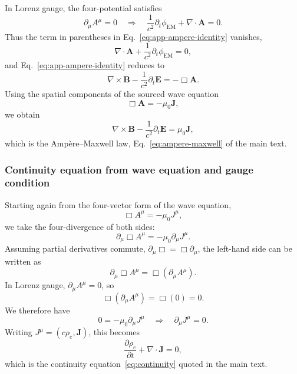 \documentclass[11pt]{article}
\begin{document}
In Lorenz gauge, the four-potential satisfies
\begin{equation}
\partial_\mu A^\mu = 0
\quad\Longrightarrow\quad
\frac{1}{c^2}\partial_t\phi_{\mathrm{EM}} + \nabla\cdot\mathbf{A} = 0.
\end{equation}
Thus the term in parentheses in Eq.~\eqref{eq:app-ampere-identity} vanishes,
\begin{equation}
\nabla\cdot\mathbf{A} + \frac{1}{c^2}\partial_t\phi_{\mathrm{EM}} = 0,
\end{equation}
and Eq.~\eqref{eq:app-ampere-identity} reduces to
\begin{equation}
\nabla\times\mathbf{B}
- \frac{1}{c^2}\partial_t\mathbf{E}
= -\Box \mathbf{A}.
\end{equation}
Using the spatial components of the sourced wave equation
\begin{equation}
\Box \mathbf{A} = -\mu_0 \mathbf{J},
\end{equation}
we obtain
\begin{equation}
\nabla\times\mathbf{B}
- \frac{1}{c^2}\partial_t\mathbf{E}
= \mu_0 \mathbf{J},
\end{equation}
which is the Amp\`ere--Maxwell law, Eq.~\eqref{eq:ampere-maxwell} of the main text.

\subsubsection{Continuity equation from wave equation and gauge condition}

Starting again from the four-vector form of the wave equation,
\begin{equation}
\Box A^\mu = -\mu_0 J^\mu,
\end{equation}
we take the four-divergence of both sides:
\begin{equation}
\partial_\mu \Box A^\mu
= -\mu_0 \partial_\mu J^\mu.
\end{equation}
Assuming partial derivatives commute, $\partial_\mu \Box = \Box \partial_\mu$, the left-hand side can be written as
\begin{equation}
\partial_\mu \Box A^\mu
= \Box (\partial_\mu A^\mu).
\end{equation}
In Lorenz gauge, $\partial_\mu A^\mu = 0$, so
\begin{equation}
\Box (\partial_\mu A^\mu) = \Box(0) = 0.
\end{equation}
We therefore have
\begin{equation}
0 = -\mu_0 \partial_\mu J^\mu
\quad\Longrightarrow\quad
\partial_\mu J^\mu = 0.
\end{equation}
Writing $J^\mu = (c\rho_e,\mathbf{J})$, this becomes
\begin{equation}
\frac{\partial \rho_e}{\partial t} + \nabla\cdot\mathbf{J} = 0,
\end{equation}
which is the continuity equation~\eqref{eq:continuity} quoted in the main text.
\end{document}
